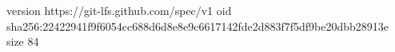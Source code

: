 version https://git-lfs.github.com/spec/v1
oid sha256:22422941f9f6054cc688d6d8e8e9c6617142fde2d883f7f5df9be20dbb28913e
size 84
